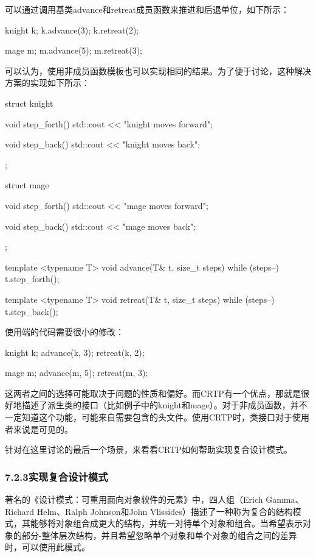 可以通过调用基类advance和retreat成员函数来推进和后退单位，如下所示：

\begin{cpp}
knight k;
k.advance(3);
k.retreat(2);

mage m;
m.advance(5);
m.retreat(3);
\end{cpp}

可以认为，使用非成员函数模板也可以实现相同的结果。为了便于讨论，这种解决方案的实现如下所示：

\begin{cpp}
struct knight
{
	void step_forth()
	{ std::cout << "knight moves forward\n"; }
	
	void step_back()
	{ std::cout << "knight moves back\n"; }
};

struct mage
{
	void step_forth()
	{ std::cout << "mage moves forward\n"; }
	
	void step_back()
	{ std::cout << "mage moves back\n"; }
};

template <typename T>
void advance(T& t, size_t steps)
{
	while (steps--) t.step_forth();
}

template <typename T>
void retreat(T& t, size_t steps)
{
	while (steps--) t.step_back();
}
\end{cpp}

使用端的代码需要很小的修改：

\begin{cpp}
knight k;
advance(k, 3);
retreat(k, 2);

mage m;
advance(m, 5);
retreat(m, 3);
\end{cpp}

这两者之间的选择可能取决于问题的性质和偏好。而CRTP有一个优点，那就是很好地描述了派生类的接口（比如例子中的knight和mage）。对于非成员函数，并不一定知道这个功能，可能来自需要包含的头文件。使用CRTP时，类接口对于使用者来说是可见的。

针对在这里讨论的最后一个场景，来看看CRTP如何帮助实现复合设计模式。

\subsubsection{7.2.3\hspace{0.2cm}实现复合设计模式}

著名的《设计模式：可重用面向对象软件的元素》中，四人组（Erich Gamma、Richard Helm、Ralph Johnson和John Vlissides）描述了一种称为复合的结构模式，其能够将对象组合成更大的结构，并统一对待单个对象和组合。当希望表示对象的部分-整体层次结构，并且希望忽略单个对象和单个对象的组合之间的差异时，可以使用此模式。

